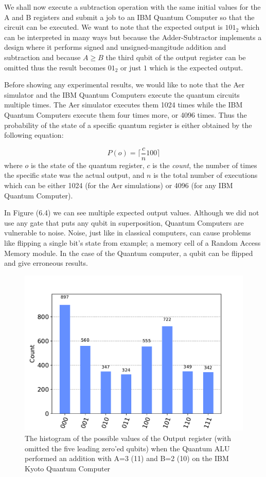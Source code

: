 We shall now execute a subtraction operation with the same initial values for the A and B registers and submit a job to an IBM Quantum Computer
so that the circuit can be executed. We want to note that the expected output is $101_2$ which can be interpreted in many ways but because
the Adder-Subtractor implements a design where it performs signed and unsigned-mangitude addition and subtraction and because $A \geq B$ the
third qubit of the output register can be omitted thus the result becomes $01_2$ or just $1$ which is the expected output.

Before showing any experimental results, we would like to note that the Aer simulator and the IBM Quantum Computers execute the quantum circuits
multiple times. The Aer simulator executes them 1024 times while the IBM Quantum Computers execute them four times more, or 4096 times. Thus the
probability of the state of a specific quantum register is either obtained by the following equation:

\begin{equation}
    P(o) = \lceil \frac{c}{n}100 \rceil
\end{equation}
where $o$ is the state of the quantum register, $c$ is the \textit{count}, the number of times the specific state was the actual output, and $n$ is the total number
of executions which can be either 1024 (for the Aer simulations) or 4096 (for any IBM Quantum Computer).

In Figure (6.4) we can see multiple expected output values. Although we did not use any gate that puts any qubit in superposition, Quantum Computers
are vulnerable to noise. Noise, just like in classical computers, can cause problems like flipping a single bit's state from example; a memory cell
of a Random Access Memory module. In the case of the Quantum computer, a qubit can be flipped and give erroneous results.

\begin{figure}[!ht]
        \centering
        \includegraphics[scale=0.7]{images/6_Complete_System/adder_subtractor_ibmq_result.pdf}
        \caption{The histogram of the possible values of the Output register (with omitted the five leading zero'ed qubits) when the Quantum ALU performed
        an addition with A=3 (11) and B=2 (10) on the IBM Kyoto Quantum Computer}
\end{figure}


